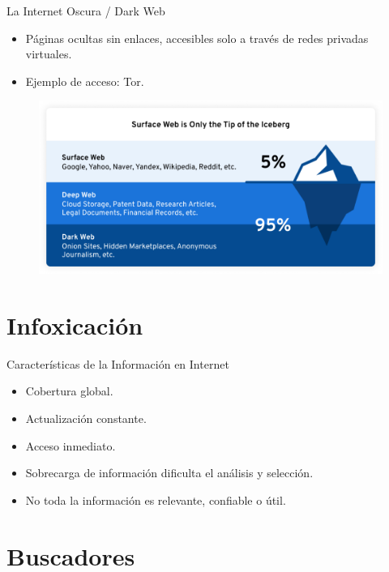 \documentclass[
11pt, %
]{beamer}
\begin{document}
\begin{frame}{La Internet Oscura / Dark Web}
	\begin{itemize}
		\item Páginas ocultas sin enlaces, accesibles solo a través de redes privadas
		      virtuales.
		\item Ejemplo de acceso: Tor.
	\end{itemize}

	\begin{figure}[H]
		\centering
		\includegraphics[width=1\linewidth]{images/image01}
	\end{figure}

\end{frame}

\section{Infoxicación}

\begin{frame}{Características de la Información en Internet}
	\begin{itemize}
		\item Cobertura global.
		\item Actualización constante.
		\item Acceso inmediato.
		\item Sobrecarga de información dificulta el análisis y selección.
		\item No toda la información es relevante, confiable o útil.
	\end{itemize}
\end{frame}

\section{Buscadores}
\end{document}
